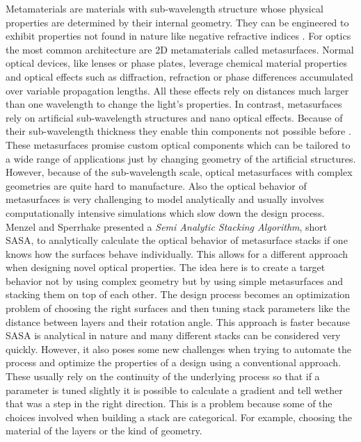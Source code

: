 Metamaterials are materials with sub-wavelength structure whose physical properties are determined by their internal geometry. They can be engineered to exhibit properties not found in nature like negative refractive indices \cite{Shelby2001}.
For optics the most common architecture are 2D metamaterials called metasurfaces.
Normal optical devices, like lenses or phase plates, leverage chemical material properties and optical effects such as diffraction, refraction or phase differences accumulated over variable propagation lengths.
All these effects rely on distances much larger than one wavelength to change the light's properties.
In contrast, metasurfaces rely on artificial sub-wavelength structures and nano optical effects.
Because of their sub-wavelength thickness they enable thin components not possible before \cite{Yu2014}.
These metasurfaces promise custom optical components which can be tailored to a wide range of applications just by changing geometry of the artificial structures. 
However, because of the sub-wavelength scale, optical metasurfaces with complex geometries are quite hard to manufacture.
Also the optical behavior of metasurfaces is very challenging to model analytically and usually involves computationally intensive simulations which slow down the design process. 
\\

 Menzel and Sperrhake \cite{Menzel2016} presented a \textit{Semi Analytic Stacking Algorithm}, short SASA, to analytically calculate the optical behavior of metasurface stacks if one knows how the surfaces behave individually.
This allows for a different approach when designing novel optical properties.
The idea here is to create a target behavior not by using complex geometry but by using simple metasurfaces and stacking them on top of each other.
The design process becomes an optimization problem of choosing the right surfaces and then tuning stack parameters like the distance between layers and their rotation angle.
This approach is faster because SASA is analytical in nature and many different stacks can be considered very quickly.
However, it also poses some new challenges when trying to automate the process and optimize the properties of a design using a conventional approach.
These usually rely on the continuity of the underlying process so that if a parameter is tuned slightly it is possible to calculate a gradient and tell wether that was a step in the right direction.
This is a problem because some of the choices involved when building a stack are categorical. For example, choosing the material of the layers or the kind of geometry.
\\

